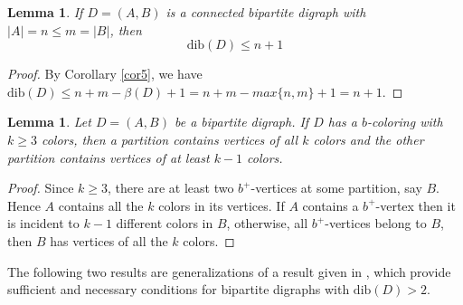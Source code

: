 \documentclass[12pt]{article}
\newtheorem{lemma}[theorem]{Lemma}
\begin{document}
\begin{lemma}\label{lemma7}
If $D=(A , B)$ is a connected bipartite digraph with $|A| = n\leq m= |B|$, then \[\text{dib}(D)\leq n+1 \]
\end{lemma}
\begin{proof}
By Corollary \ref{cor5}, we have $\text{dib}(D)\leq n+m-\beta(D)+1=n+m-max\{n,m\}+1=n+1.$
\end{proof}

\begin{lemma}\label{lema8}
Let $D=(A, B)$ be a bipartite digraph. If $D$ has a $b$-coloring with $k\geq 3$ colors, then a partition contains vertices of all $k$ colors and the other partition contains vertices of at least $k-1$ colors.
\end{lemma}
\begin{proof}
Since $k \geq 3$, there are at least two $b^+$-vertices at some partition, say $B$. Hence $A$ contains all the $k$ colors in its vertices. If $A$ contains a $b^+$-vertex then it is incident to $k-1$ different colors in $B$, otherwise, all $b^+$-vertices belong to $B$, then $B$ has vertices of all the $k$ colors.
\end{proof}

The following two results are generalizations of a result given in \cite{MR2063820}, which provide sufficient and necessary conditions for bipartite digraphs with $\text{dib}(D)>2$.
\end{document}
